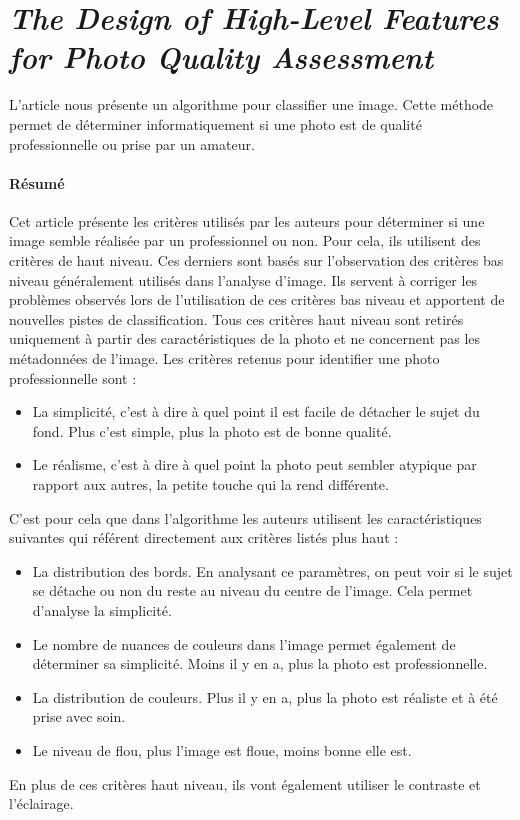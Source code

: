 \documentclass[11pt, french]{report-rd-info}
\begin{document}
\section{\emph{The Design of High-Level Features for Photo Quality Assessment}}
L'article \cite{Ke} nous présente un algorithme pour classifier une image. Cette méthode permet de déterminer informatiquement si une photo est de qualité professionnelle ou prise par un amateur.
\paragraph{Résumé}
Cet article présente les critères utilisés par les auteurs pour déterminer si une image semble réalisée par un professionnel ou non. Pour cela, ils utilisent des critères de haut niveau. Ces derniers sont basés sur l'observation des critères bas niveau généralement utilisés dans l'analyse d'image. Ils servent à corriger les problèmes observés lors de l'utilisation de ces critères bas niveau et apportent de nouvelles pistes de classification.
Tous ces critères haut niveau sont retirés uniquement à partir des caractéristiques de la photo et ne concernent pas les métadonnées de l'image.
Les critères retenus pour identifier une photo professionnelle sont :
\begin{itemize}
\item La simplicité, c'est à dire à quel point il est facile de détacher le sujet du fond. Plus c'est simple, plus la photo est de bonne qualité.
\item Le réalisme, c'est à dire à quel point la photo peut sembler atypique par rapport aux autres, la petite touche qui la rend différente.
\end{itemize}
C'est pour cela que dans l'algorithme les auteurs utilisent les caractéristiques suivantes qui référent directement aux critères listés plus haut :
\begin{itemize}
\item La distribution des bords. En analysant ce paramètres, on peut voir si le sujet se détache ou non du reste au niveau du centre de l'image. Cela permet d'analyse la simplicité.
\item Le nombre de nuances de couleurs dans l'image permet également de déterminer sa simplicité. Moins il y en a, plus la photo est professionnelle.
\item La distribution de couleurs. Plus il y en a, plus la photo est réaliste et à été prise avec soin.
\item Le niveau de flou, plus l'image est floue, moins bonne elle est.
\end{itemize}
En plus de ces critères haut niveau, ils vont également utiliser le contraste et l'éclairage.
\end{document}

